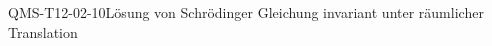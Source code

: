 
\begin{CONC}{QMS-T12-02-10}{Lösung von Schrödinger Gleichung invariant unter räumlicher Translation}
\end{CONC}
